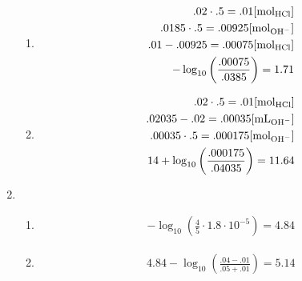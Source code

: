 \documentclass[12pt]{article}
\begin{document}
\begin{enumerate}
\begin{enumerate}
      \item

        \begin{equation}
          \begin{split}
            .02\cdot.5=.01[\si{\mole_{\ce{HCl}}}]\\
            .0185\cdot.5=.00925[\si{\mole}_{\ce{OH-}}]\\
            .01-.00925=.00075[\si{\mole}_{\ce{HCl}}]\\
            -\log_{10}\left( \frac{.00075}{.0385} \right)=1.71
          \end{split}
          \label{4}
        \end{equation}

      \item

        \begin{equation}
          \begin{split}
            .02\cdot.5=.01[\si{\mole_{\ce{HCl}}}]\\
            .02035-.02=.00035[\si{\milli\liter}_{\ce{OH-}}]\\
            .00035\cdot.5=.000175[\si{\mole}_{\ce{OH-}}]\\
            14+\log_{10}\left( \frac{.000175}{.04035} \right)=11.64
          \end{split}
          \label{5}
        \end{equation}

    \end{enumerate}

  \item 

    \begin{enumerate}

      \item 

        \begin{equation}
          \begin{split}
            -\log_{10}\left( \frac{4}{5}\cdot1.8\cdot10^{-5} \right)=4.84
          \end{split}
          \label{6}
        \end{equation}

      \item

        \begin{equation}
          \begin{split}
            4.84-\log_{10}\left( \frac{.04-.01}{.05+.01}  \right)=5.14
          \end{split}
          \label{7}
        \end{equation}


\end{enumerate}
\end{enumerate}
\end{document}

